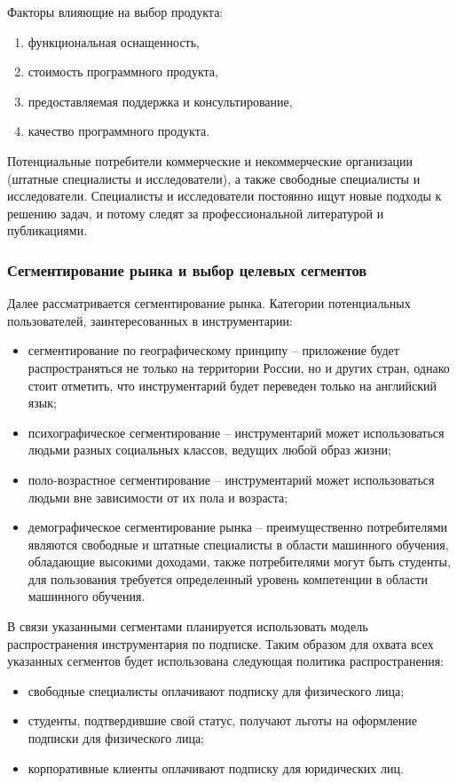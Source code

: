 \documentclass[../main]{subfiles}
\begin{document}
Факторы влияющие на выбор продукта:
\begin{enumerate}
    \item функциональная оснащенность,
    \item стоимость программного продукта,
    \item предоставляемая поддержка и консультирование,
    \item качество программного продукта.
\end{enumerate}

Потенциальные потребители коммерческие и некоммерческие организации (штатные специалисты и исследователи), а также свободные специалисты и исследователи. Специалисты и исследователи постоянно ищут новые подходы к решению задач, и потому следят за профессиональной литературой и публикациями.

\subsubsection{Сегментирование рынка и выбор целевых сегментов}
Далее рассматривается сегментирование рынка. Категории потенциальных пользователей, заинтересованных в инструментарии:
\begin{itemize}
    \item сегментирование по географическому принципу -- приложение будет распространяться не только на территории России, но и других стран, однако стоит отметить, что инструментарий будет переведен только на английский язык;
    \item психографическое сегментирование -- инструментарий может использоваться людьми разных социальных классов, ведущих любой образ жизни;
    \item поло-возрастное сегментирование -- инструментарий может использоваться людьми вне зависимости от их пола и возраста;
    \item демографическое сегментирование рынка -- преимущественно потребителями являются свободные и штатные специалисты в области машинного обучения, обладающие высокими доходами, также потребителями могут быть студенты, для пользования требуется определенный уровень компетенции в области машинного обучения.
\end{itemize}

В связи указанными сегментами планируется использовать модель распространения инструментария по подписке. Таким образом для охвата всех указанных сегментов будет использована следующая политика распространения:
\begin{itemize}
    \item свободные специалисты оплачивают подписку для физического лица;
    \item студенты, подтвердившие свой статус, получают льготы на оформление подписки для физического лица;
    \item корпоративные клиенты оплачивают подписку для юридических лиц.
\end{itemize}
\end{document}
